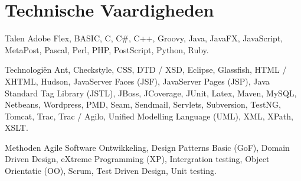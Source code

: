 \section*{Technische Vaardigheden}

	\begin{skillList}
		\item[Talen] Adobe Flex, BASIC, C, C\#, C++, Groovy, Java, JavaFX,
		JavaScript, MetaPost, Pascal, Perl, PHP, PostScript, Python, Ruby.
		\hfill\\
		
		\item[Technologi\"en] Ant, Checkstyle, CSS, DTD / XSD, Eclipse, Glassfish, 
		HTML / XHTML, Hudson, JavaServer Faces (JSF), JavaServer Pages (JSP), 
		Java Standard Tag Library (JSTL), JBoss, JCoverage, JUnit, Latex, Maven,
		MySQL, Netbeans, Wordpress, PMD, Seam, Sendmail, Servlets, Subversion,
		TestNG, Tomcat, Trac, Trac / Agilo, Unified Modelling Language (UML), XML,
		XPath, XSLT.
		\hfill\\
		
		\item[Methoden] Agile Software Ontwikkeling, Design Patterns Basic 
		(GoF), Domain Driven Design, eXtreme Programming (XP), Intergration testing,
		Object Orientatie (OO), Scrum, Test Driven Design, Unit testing.
		\hfill\\
		
	\end{skillList}
